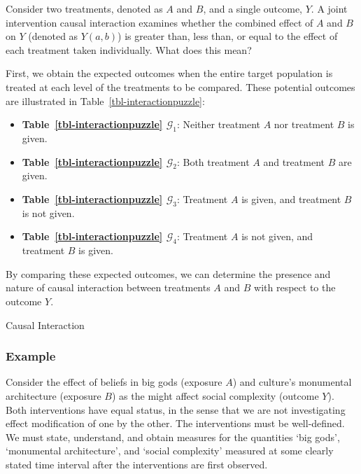 \documentclass[
  single column]{article}
\providecommand{\tightlist}{%
  \setlength{\itemsep}{0pt}\setlength{\parskip}{0pt}}\usepackage{longtable,booktabs,array}
\begin{document}
Consider two treatments, denoted as \(A\) and \(B\), and a single
outcome, \(Y\). A joint intervention causal interaction examines whether
the combined effect of \(A\) and \(B\) on \(Y\) (denoted as \(Y(a,b)\))
is greater than, less than, or equal to the effect of each treatment
taken individually. What does this mean?

First, we obtain the expected outcomes when the entire target population
is treated at each level of the treatments to be compared. These
potential outcomes are illustrated in Table~\ref{tbl-interactionpuzzle}:

\begin{itemize}
\tightlist
\item
  \textbf{Table~\ref{tbl-interactionpuzzle} \(\mathcal{G}_1\)}: Neither
  treatment \(A\) nor treatment \(B\) is given.
\item
  \textbf{Table~\ref{tbl-interactionpuzzle} \(\mathcal{G}_2\)}: Both
  treatment \(A\) and treatment \(B\) are given.
\item
  \textbf{Table~\ref{tbl-interactionpuzzle} \(\mathcal{G}_3\)}:
  Treatment \(A\) is given, and treatment \(B\) is not given.
\item
  \textbf{Table~\ref{tbl-interactionpuzzle} \(\mathcal{G}_4\)}:
  Treatment \(A\) is not given, and treatment \(B\) is given.
\end{itemize}

By comparing these expected outcomes, we can determine the presence and
nature of causal interaction between treatments \(A\) and \(B\) with
respect to the outcome \(Y\).

\begin{table}

\caption{\label{tbl-interactionpuzzle}Causal Interaction}

\centering{

\interactionpuzzle

}

\end{table}%

\subsubsection{Example}\label{example}

Consider the effect of beliefs in big gods (exposure \(A\)) and
culture's monumental architecture (exposure \(B\)) as the might affect
social complexity (outcome \(Y\)). Both interventions have equal status,
in the sense that we are not investigating effect modification of one by
the other. The interventions must be well-defined. We must state,
understand, and obtain measures for the quantities `big gods',
`monumental architecture', and `social complexity' measured at some
clearly stated time interval after the interventions are first observed.
\end{document}
